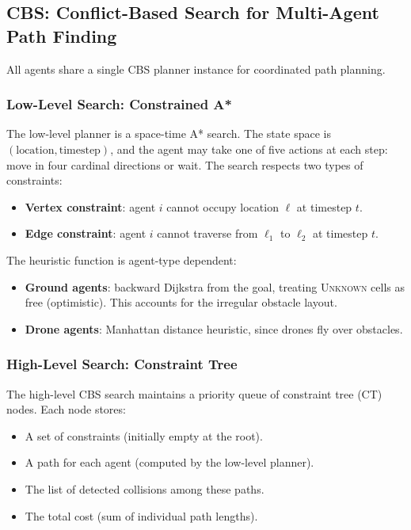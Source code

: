 \documentclass[conference]{IEEEtran}
\begin{document}
\subsection{CBS: Conflict-Based Search for Multi-Agent Path Finding}

All agents share a single CBS planner instance for coordinated path planning.

\subsubsection{Low-Level Search: Constrained A*}
The low-level planner is a space-time A* search. The state space is $(\text{location}, \text{timestep})$, and the agent may take one of five actions at each step: move in four cardinal directions or wait. The search respects two types of constraints:
\begin{itemize}
    \item \textbf{Vertex constraint}: agent $i$ cannot occupy location $\ell$ at timestep $t$.
    \item \textbf{Edge constraint}: agent $i$ cannot traverse from $\ell_1$ to $\ell_2$ at timestep $t$.
\end{itemize}

The heuristic function is agent-type dependent:
\begin{itemize}
    \item \textbf{Ground agents}: backward Dijkstra from the goal, treating \textsc{Unknown} cells as free (optimistic). This accounts for the irregular obstacle layout.
    \item \textbf{Drone agents}: Manhattan distance heuristic, since drones fly over obstacles.
\end{itemize}

\subsubsection{High-Level Search: Constraint Tree}
The high-level CBS search maintains a priority queue of constraint tree (CT) nodes. Each node stores:
\begin{itemize}
    \item A set of constraints (initially empty at the root).
    \item A path for each agent (computed by the low-level planner).
    \item The list of detected collisions among these paths.
    \item The total cost (sum of individual path lengths).
\end{itemize}
\end{document}
